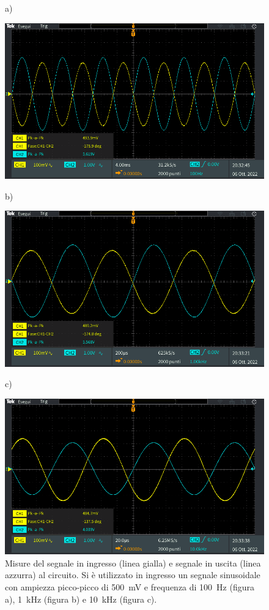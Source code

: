 \begin{figure}[h!]
	\centering
	a)
	
	\includegraphics[width=0.8\linewidth]{./ImageFiles/Laboratorio 1/TEK00001}	
\end{figure}
\begin{figure}[h!]
	\centering
	b)
	
	\includegraphics[width=0.8\linewidth]{./ImageFiles/Laboratorio 1/TEK00002}
\end{figure}
\begin{figure}[h]
	\centering
	c)
	
	\includegraphics[width=0.8\linewidth]{./ImageFiles/Laboratorio 1/TEK00004}
	\caption{Misure del segnale in ingresso (linea gialla) e segnale in uscita (linea azzurra) al circuito. Si è utilizzato in ingresso un segnale sinusoidale con ampiezza picco-picco di \SI{500}{\milli\volt} e frequenza di \SI{100}{\hertz} (figura a), \SI{1}{\kilo\hertz} (figura b) e \SI{10}{\kilo\hertz} (figura c).}
	\label{fig:misure_oscilloscopio_1}
\end{figure}

